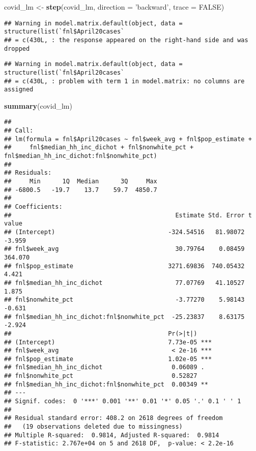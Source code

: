 \documentclass[
]{article}
\newenvironment{Shaded}{\begin{snugshade}}{\end{snugshade}}
\newcommand{\DataTypeTok}[1]{\textcolor[rgb]{0.13,0.29,0.53}{#1}}
\newcommand{\KeywordTok}[1]{\textcolor[rgb]{0.13,0.29,0.53}{\textbf{#1}}}
\newcommand{\NormalTok}[1]{#1}
\newcommand{\OtherTok}[1]{\textcolor[rgb]{0.56,0.35,0.01}{#1}}
\newcommand{\StringTok}[1]{\textcolor[rgb]{0.31,0.60,0.02}{#1}}
\begin{document}
\begin{Shaded}
\begin{Highlighting}[]
\NormalTok{covid_lm <-}\StringTok{ }\KeywordTok{step}\NormalTok{(covid_lm, }\DataTypeTok{direction =} \StringTok{'backward'}\NormalTok{, }\DataTypeTok{trace =} \OtherTok{FALSE}\NormalTok{)}
\end{Highlighting}
\end{Shaded}

\begin{verbatim}
## Warning in model.matrix.default(object, data = structure(list(`fnl$April20cases`
## = c(430L, : the response appeared on the right-hand side and was dropped
\end{verbatim}

\begin{verbatim}
## Warning in model.matrix.default(object, data = structure(list(`fnl$April20cases`
## = c(430L, : problem with term 1 in model.matrix: no columns are assigned
\end{verbatim}

\begin{Shaded}
\begin{Highlighting}[]
\KeywordTok{summary}\NormalTok{(covid_lm)}
\end{Highlighting}
\end{Shaded}

\begin{verbatim}
## 
## Call:
## lm(formula = fnl$April20cases ~ fnl$week_avg + fnl$pop_estimate + 
##     fnl$median_hh_inc_dichot + fnl$nonwhite_pct + fnl$median_hh_inc_dichot:fnl$nonwhite_pct)
## 
## Residuals:
##     Min      1Q  Median      3Q     Max 
## -6800.5   -19.7    13.7    59.7  4850.7 
## 
## Coefficients:
##                                             Estimate Std. Error t value
## (Intercept)                               -324.54516   81.98072  -3.959
## fnl$week_avg                                30.79764    0.08459 364.070
## fnl$pop_estimate                          3271.69836  740.05432   4.421
## fnl$median_hh_inc_dichot                    77.07769   41.10527   1.875
## fnl$nonwhite_pct                            -3.77270    5.98143  -0.631
## fnl$median_hh_inc_dichot:fnl$nonwhite_pct  -25.23837    8.63175  -2.924
##                                           Pr(>|t|)    
## (Intercept)                               7.73e-05 ***
## fnl$week_avg                               < 2e-16 ***
## fnl$pop_estimate                          1.02e-05 ***
## fnl$median_hh_inc_dichot                   0.06089 .  
## fnl$nonwhite_pct                           0.52827    
## fnl$median_hh_inc_dichot:fnl$nonwhite_pct  0.00349 ** 
## ---
## Signif. codes:  0 '***' 0.001 '**' 0.01 '*' 0.05 '.' 0.1 ' ' 1
## 
## Residual standard error: 408.2 on 2618 degrees of freedom
##   (19 observations deleted due to missingness)
## Multiple R-squared:  0.9814, Adjusted R-squared:  0.9814 
## F-statistic: 2.767e+04 on 5 and 2618 DF,  p-value: < 2.2e-16
\end{verbatim}
\end{document}
